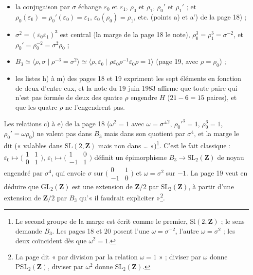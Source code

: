 \documentclass[11pt,a4paper]{article}
\begin{document}
\begin{itemize}
  \item la conjugaison par $\sigma$ échange $\varepsilon_0$ et
    $\varepsilon_1$, $\rho_0$ et $\rho_1$, $\rho_0'$ et $\rho_1'$ ; et
    $\rho_0(\varepsilon_0) = \rho_0'(\varepsilon_0) = \varepsilon_1$,
    $\varepsilon_0(\rho_0) = \rho_1$, etc. (points a) et a') de la page 18) ;
  \item $\sigma^2 = (\varepsilon_0\varepsilon_1)^3$ est central (la marge de
    la page 18 le note), $\rho_0^3 = \rho_1^3 = \sigma^{-2}$, et $\rho_0' =
    \rho_0^{-2} = \sigma^2\rho_0$ ;
  \item $B_3 \simeq \langle \rho, \sigma \mid \rho^{-3} = \sigma^2 \rangle
    \simeq \langle \rho, \varepsilon_0 \mid \rho\varepsilon_0\rho^{-1}\varepsilon_0\rho
    = 1\rangle$ (page 19, avec $\rho = \rho_0$) ;
  \item les listes h) à m) des pages 18 et 19 expriment les sept éléments en
    fonction de deux d'entre eux, et la note du 19 juin 1983 affirme que toute
    paire qui n'est pas formée de deux des quatre $\rho$ engendre $H$ ($21 - 6
    = 15$ paires), et que les quatre $\rho$ ne l'engendrent pas.
\end{itemize}

Les relations c) à e) de la page 18 ($\omega^2 = 1$ avec $\omega =
\sigma^{\pm 2}$, $\rho_0'^3 = 1$, $\rho_0^6 = 1$, $\rho_0' = \omega\rho_0$) ne
valent pas dans $B_3$ mais dans son quotient par $\sigma^4$, et la marge le
dit (« valables dans $\mathrm{SL}(2, \mathbf{Z})$ mais non dans … »)\footnote{Le
second groupe de la marge est écrit comme le premier, $\mathrm{Sl}(2,
\mathbf{Z})$ ; le sens demande $B_3$. Les pages 18 et 20 posent l'une $\omega =
\sigma^{-2}$, l'autre $\omega = \sigma^2$ ; les deux coïncident dès que $\omega^2
= 1$.}. C'est le fait classique : $\varepsilon_0 \mapsto
\bigl(\begin{smallmatrix} 1 & 1 \\ 0 & 1\end{smallmatrix}\bigr)$,
$\varepsilon_1 \mapsto \bigl(\begin{smallmatrix} 1 & 0 \\ -1 & 1\end{smallmatrix}\bigr)$
définit un épimorphisme $B_3 \to \mathrm{SL}_2(\mathbf{Z})$ de noyau engendré
par $\sigma^4$, qui envoie $\sigma$ sur $\bigl(\begin{smallmatrix} 0 & 1 \\ -1
& 0\end{smallmatrix}\bigr)$ et $\omega = \sigma^2$ sur $-1$. La page 19 veut
en déduire que $\mathrm{GL}_2(\mathbf{Z})$ est une extension de
$\mathbf{Z}/2$ par $\mathrm{SL}_2(\mathbf{Z})$, à partir d'une extension de
$\mathbf{Z}/2$ par $B_3$ qu'« il faudrait expliciter »\footnote{La page dit
« par division par la relation $\omega = 1$ » ; diviser par $\omega$ donne
$\mathrm{PSL}_2(\mathbf{Z})$, diviser par $\omega^2$ donne
$\mathrm{SL}_2(\mathbf{Z})$.}.
\end{document}
